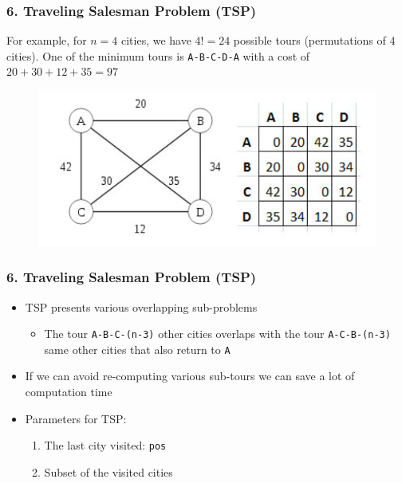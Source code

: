 \documentclass{beamer}
\begin{document}
\begin{frame}[fragile]
\frametitle{6. Traveling Salesman Problem (TSP)}

For example, for $n=4$ cities, we have $4!=24$ possible tours (permutations of 4 cities). One of the minimum tours is \verb|A-B-C-D-A| with a cost of $20+30+12+35 = 97$

\begin{figure}
    \centering
    \includegraphics[scale=0.6]{imgs/tsp.png}
\end{figure}

\end{frame}

\begin{frame}[fragile]
\frametitle{6. Traveling Salesman Problem (TSP)}

\begin{itemize}
    \item TSP presents various overlapping sub-problems
    \begin{itemize}
        \item The tour \verb|A-B-C-(n-3)| other cities overlaps with the tour \verb|A-C-B-(n-3)| same other cities that also return to \verb|A|
    \end{itemize}
    \item If we can avoid re-computing various sub-tours we can save a lot of computation time
    \item Parameters for TSP: 
    \begin{enumerate}
        \item The last city visited: \verb|pos|
        \item Subset of the visited cities
    \end{enumerate}
\end{itemize}

\end{frame}
\end{document}
